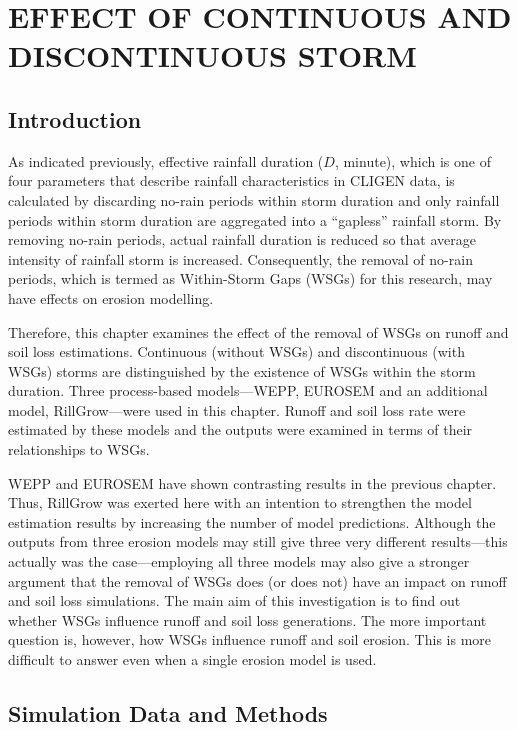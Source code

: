 \chapter{EFFECT OF CONTINUOUS AND DISCONTINUOUS STORM}
\label{sec:EFFECTSOFCONTINOUSANDDISCONTINUSSTORM}

\section{Introduction}
\label{sec:ContinousAndDiscontinousStormIntroduction}

As indicated previously, effective rainfall duration ($D$, minute), which
is one of four parameters that describe rainfall characteristics in CLIGEN
data, is calculated by discarding no-rain periods within storm duration and
only rainfall periods within storm duration are aggregated into a ``gapless''
rainfall storm. By removing no-rain periods, actual rainfall duration is
reduced so that average intensity of rainfall storm is increased. Consequently,
the removal of no-rain periods, which is termed as Within-Storm Gaps (WSGs) for
this research, may have effects on erosion modelling.

Therefore, this chapter examines the effect of the removal of WSGs on
runoff and soil loss estimations. Continuous (without WSGs) and discontinuous
(with WSGs) storms are distinguished by the existence of WSGs within the storm
duration. Three process-based models---WEPP, EUROSEM and an additional model,
RillGrow---were used in this chapter. Runoff and soil loss rate were estimated
by these models and the outputs were examined in terms of their relationships to
WSGs.

WEPP and EUROSEM have shown contrasting results in the previous chapter. Thus,
RillGrow was exerted here with an intention to strengthen the model estimation
results by increasing the number of model predictions. Although the outputs from
three erosion models may still give three very different results---this actually
was the case---employing all three models may also give a stronger argument that
the removal of WSGs does (or does not) have an impact on runoff and soil loss
simulations.
The main aim of this investigation is to find out whether WSGs influence runoff
and soil loss generations. The more important question is, however, how WSGs
influence runoff and soil erosion. This is more difficult to answer even when a
single erosion model is used.

\section{Simulation Data and Methods}
\label{sec:ContinousAndDiscontinousStormMethods}


